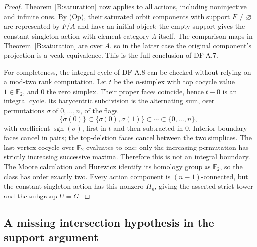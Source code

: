 \begin{proof}
Theorem~\ref{B:saturation} now applies to all actions, including
noninjective and infinite ones. By (Op), their saturated orbit
components with support $F\ne\varnothing$ are represented by
$F/A$ and have an initial object; the empty support gives the
constant singleton action with element category $A$ itself.
The comparison maps in Theorem~\ref{B:saturation} are over $A$,
so in the latter case the original component's projection is
a weak equivalence. This is the full conclusion of DF A.7.

For completeness, the integral cycle of DF A.8 can be checked
without relying on a mod-two rank computation. Let $t$ be the
$n$-simplex with top cocycle value $1\in\mathbb F_2$, and $0$
the zero simplex. Their proper faces coincide, hence $t-0$ is
an integral cycle. Its barycentric subdivision is the alternating
sum, over permutations $\sigma$ of $0,\ldots,n$, of the flags
\[
 \{\sigma(0)\}\subset\{\sigma(0),\sigma(1)\}\subset
 \cdots\subset\{0,\ldots,n\},
\]
with coefficient $\operatorname{sgn}(\sigma)$, first in $t$ and
then subtracted in $0$. Interior boundary faces cancel in pairs;
the top-deletion faces cancel between the two simplices.
The last-vertex cocycle over $\mathbb F_2$ evaluates to one:
only the increasing permutation has strictly increasing
successive maxima. Therefore this is not an integral boundary.
The Moore calculation and Hurewicz identify its homology group
as $\mathbb F_2$, so the class has order exactly two.
Every action component is $(n-1)$-connected, but the constant
singleton action has this nonzero $H_n$, giving the asserted
strict tower and the subgroup $U=G$.
\end{proof}

\subsection{A missing intersection hypothesis in the support argument}


